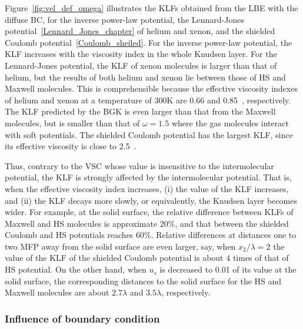 Figure~\ref{fig:vel_def_omega} illustrates the KLFs obtained from the LBE with the  diffuse BC, for the inverse power-law potential, the Lennard-Jones potential~\eqref{Lennard_Jones_chapter} of helium and xenon, and the shielded Coulomb potential~\eqref{Coulomb_sheiled}. For the inverse power-law potential, the KLF increases with the viscosity index in the whole Knudsen layer. For the Lennard-Jones potential, the KLF of xenon molecules is larger than that of helium, but the results of both helium and xenon lie between those of HS and Maxwell molecules. This is comprehensible because the effective viscosity indexes of helium and xenon at a temperature of $300$K are 0.66 and 0.85~\cite{Bird1994}, respectively. The KLF predicted by the BGK is even larger than that from the Maxwell molecules, but is smaller than that of $\omega=1.5$ where the gas molecules interact with soft potentials. The shielded Coulomb potential has the largest KLF, since its effective viscosity is close to 2.5~\cite{CE}.


Thus, contrary to the VSC whose value is insensitive to the intermolecular potential, the KLF is strongly affected by the intermolecular potential. That is, when the effective viscosity index increases, (i) the value of the KLF increases, and (ii) the KLF decays more slowly, or equivalently, the Knudsen layer becomes wider. For example, at the solid surface, the relative difference between KLFs of Maxwell and HS molecules is approximate $20\%$, and that between the shielded Coulomb and HS potentials  reaches 60\%. Relative differences at distances one to two MFP away from the solid surface are even larger, say, when $x_2/\lambda=2$ the value of the KLF of the shielded Coulomb potential is about 4 times of that of HS potential. On the other hand, when $u_s$ is decreased to 0.01 of its value at the solid surface, the corresponding distances to the solid surface for the HS and Maxwell molecules are about $2.7\lambda$ and $3.5\lambda$, respectively.  



\subsubsection{Influence of boundary condition}


